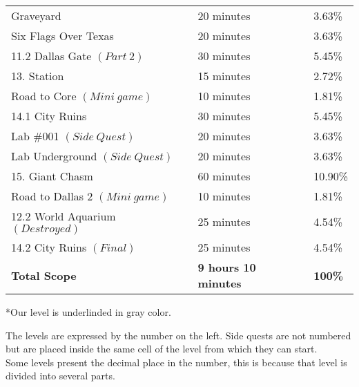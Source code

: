\begin{center}
\begin{tabular}[c]{| p{6cm} | p{4cm} | p{3cm} |}
		        		    Graveyard                 & 20 minutes                  & 3.63\%                 \\
		        	  Six Flags Over Texas            & 20 minutes                  & 3.63\%                 \\ \hline
		          11.2 Dallas Gate $(Part\:2)$		      & 30 minutes                  & 5.45\%                 \\ \hline
		                 13. Station                  & 15 minutes                  & 2.72\%                 \\ \hline
					Road to Core $(Mini\:game)$		  & 10 minutes					& 1.81\%				  \\ \hline
		              14.1 City Ruins                 & 30 minutes                  & 5.45\%                 \\
				 Lab \#001 $(Side\:Quest)$     	      & 20 minutes                  & 3.63\%                 \\
			Lab Underground $(Side\:Quest)$           & 20 minutes                  & 3.63\%                 \\ \hline\hline
				\rowcolor{light-light-gray}
						15. Giant Chasm				  & 60 minutes                	& 10.90\%                \\ \hline
				Road to Dallas 2 $(Mini\:game)$		  & 10 minutes					& 1.81\%					\\ \hline
				12.2 World Aquarium $(Destroyed)$       & 25 minutes             	    & 4.54\%                 \\ \hline
					14.2 City Ruins $(Final)$   	   	  & 25 minutes                  & 4.54\%                 \\ \hline
		            \textbf{Total Scope}              & \textbf{9 hours 10 minutes} & \textbf{100\%}      \\ \hline
	\end{tabular}
\end{center}

*Our level is underlinded in gray color.\\

\vspace*{0.5cm}

The levels are expressed by the number on the left. Side quests are not numbered but are placed inside the same cell of the level from which they can start.\\
Some levels present the decimal place in the number, this is because that level is divided into several parts.